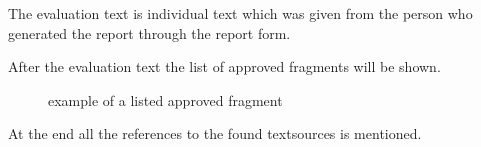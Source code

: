The evaluation text is individual text which was given from the person who generated the report through the report form.

After the evaluation text the list of approved fragments will be shown.

\begin{figure}[!h]
  \centering
  \caption{example of a listed approved fragment}
  \label{fig:report_fragment}
\end{figure}

At the end all the references to the found textsources is mentioned.

